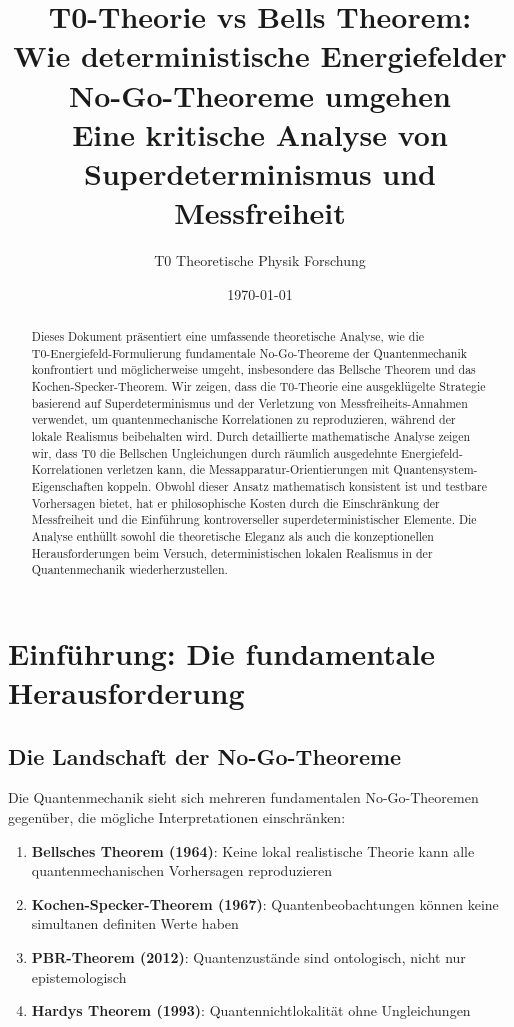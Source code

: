 \documentclass[12pt,a4paper]{article}
\title{T0-Theorie vs Bells Theorem: \\
	Wie deterministische Energiefelder No-Go-Theoreme umgehen \\
	\large Eine kritische Analyse von Superdeterminismus und Messfreiheit}
\author{T0 Theoretische Physik Forschung}
\date{\today}
\begin{document}
	
	\maketitle
	
	\begin{abstract}
		Dieses Dokument präsentiert eine umfassende theoretische Analyse, wie die \\T0-Energiefeld-Formulierung fundamentale No-Go-Theoreme der Quantenmechanik konfrontiert und möglicherweise umgeht, insbesondere das Bellsche Theorem und das Kochen-Specker-Theorem. Wir zeigen, dass die T0-Theorie eine ausgeklügelte Strategie basierend auf Superdeterminismus und der Verletzung von Messfreiheits-Annahmen verwendet, um quantenmechanische Korrelationen zu reproduzieren, während der lokale Realismus beibehalten wird. Durch detaillierte mathematische Analyse zeigen wir, dass T0 die Bellschen Ungleichungen durch räumlich ausgedehnte Energiefeld-Korrelationen verletzen kann, die Messapparatur-Orientierungen mit Quantensystem-Eigenschaften koppeln. Obwohl dieser Ansatz mathematisch konsistent ist und testbare Vorhersagen bietet, hat er philosophische Kosten durch die Einschränkung der Messfreiheit und die Einführung kontroverseller superdeterministischer Elemente. Die Analyse enthüllt sowohl die theoretische Eleganz als auch die konzeptionellen Herausforderungen beim Versuch, deterministischen lokalen Realismus in der Quantenmechanik wiederherzustellen.
	\end{abstract}
	
	\tableofcontents
	\newpage
	
	\section{Einführung: Die fundamentale Herausforderung}
	
	\subsection{Die Landschaft der No-Go-Theoreme}
	
	Die Quantenmechanik sieht sich mehreren fundamentalen No-Go-Theoremen gegenüber, die mögliche Interpretationen einschränken:
	
	\begin{enumerate}
		\item \textbf{Bellsches Theorem (1964)}: Keine lokal realistische Theorie kann alle quantenmechanischen Vorhersagen reproduzieren
		\item \textbf{Kochen-Specker-Theorem (1967)}: Quantenbeobachtungen können keine simultanen definiten Werte haben
		\item \textbf{PBR-Theorem (2012)}: Quantenzustände sind ontologisch, nicht nur epistemologisch
		\item \textbf{Hardys Theorem (1993)}: Quantennichtlokalität ohne Ungleichungen
	\end{enumerate}
	
\end{document}
